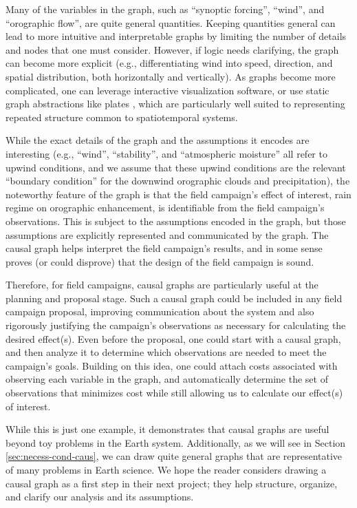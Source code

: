 \documentclass[12pt]{article}
\begin{document}
Many of the variables in the graph, such as ``synoptic forcing'',
``wind'', and ``orographic flow'', are quite general
quantities. Keeping quantities general can lead to more intuitive and
interpretable graphs by limiting the number of details and nodes that
one must consider. However, if logic needs clarifying, the graph can
become more explicit (e.g., differentiating wind into speed,
direction, and spatial distribution, both horizontally and
vertically). As graphs become more complicated, one can leverage
interactive visualization software, or use static graph abstractions
like plates \citep{bishop2006pattern}, which are particularly well
suited to representing repeated structure common to spatiotemporal
systems.

While the exact details of the graph and the assumptions it encodes
are interesting (e.g., ``wind'', ``stability'', and ``atmospheric
moisture'' all refer to upwind conditions, and we assume that these
upwind conditions are the relevant ``boundary condition'' for the
downwind orographic clouds and precipitation), the noteworthy feature
of the graph is that the field campaign's effect of interest, rain
regime on orographic enhancement, is identifiable from the field
campaign's observations. This is subject to the assumptions encoded in
the graph, but those assumptions are explicitly represented and
communicated by the graph. The causal graph helps interpret the field
campaign's results, and in some sense proves (or could disprove) that
the design of the field campaign is sound.

Therefore, for field campaigns, causal graphs are particularly useful at the
planning and proposal stage. Such a causal graph could be included in
any field campaign proposal, improving communication about the system
and also rigorously justifying the campaign’s observations as
necessary for calculating the desired effect(s). Even before the
proposal, one could start with a causal graph, and then analyze it to
determine which observations are needed to meet the campaign’s
goals. Building on this idea, one could attach costs associated with
observing each variable in the graph, and automatically determine the
set of observations that minimizes cost while still allowing us to
calculate our effect(s) of interest.

While this is just one example, it demonstrates that causal graphs are
useful beyond toy problems in the Earth system. Additionally, as we
will see in Section \ref{sec:necess-cond-caus}, we can draw quite
general graphs that are representative of many problems in Earth
science. We hope the reader considers drawing a causal graph as a
first step in their next project; they help structure, organize, and
clarify our analysis and its assumptions.
\end{document}
